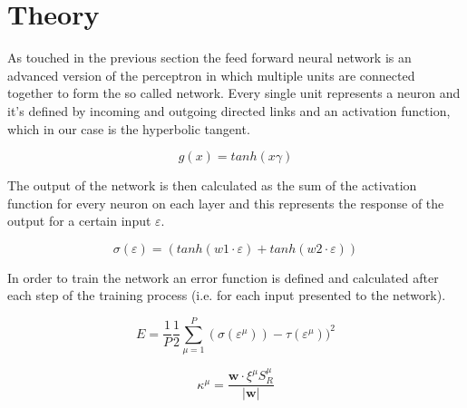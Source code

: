 \section{Theory}
\label{sec:theory}

As touched in the previous section the feed forward neural network is an advanced version of the
perceptron in which multiple units are connected together to form the so called network. Every
single unit represents a neuron and it's defined by incoming and outgoing directed links and
an activation function, which in our case is the hyperbolic tangent.

\begin{equation}
    \label{eq:single-unit-activation-fun}
    g(x) = tanh(x\gamma)
\end{equation}

The output of the network is then calculated as the sum of the activation function for every neuron
on each layer and this represents the response of the output for a certain input $\varepsilon$.

\begin{equation}
    \sigma (\varepsilon) = (tanh(w1 \cdotp \varepsilon) + tanh(w2 \cdotp \varepsilon))
\end{equation}

In order to train the network an error function is defined and calculated after each step of the training process
(i.e. for each input presented to the network).

\begin{equation}
    E = \frac{1}{P}\frac{1}{2} \sum_{\mu = 1}^{P} (\sigma(\varepsilon^\mu)) - \tau(\varepsilon^\mu))^2
\end{equation}

\blindtext

\begin{equation}
    \kappa^\mu = \frac{\mathsf{\bm{w}} \cdotp \xi^\mu S^\mu_R}{\lvert \mathsf{\bm{w}} \rvert}
    \label{eq:perceptron-stability}
\end{equation}